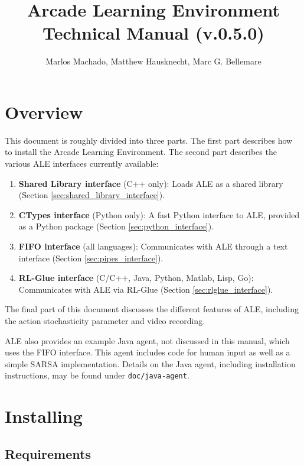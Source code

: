 \documentclass[12pt]{article}
\title{Arcade Learning Environment\\ Technical Manual (v.0.5.0)}
\author{Marlos Machado, Matthew Hausknecht, Marc G. Bellemare}
\begin{document}
\maketitle

\clearpage

\tableofcontents

\clearpage

\section{Overview}

This document is roughly divided into three parts. The first part describes how to install the Arcade Learning Environment. The second part describes the various ALE interfaces currently available: 
\begin{enumerate}
  \item \textbf{Shared Library interface} (C++ only): Loads ALE as a shared library (Section 
  \ref{sec:shared_library_interface}).
  \item \textbf{CTypes interface} (Python only): A fast Python interface to ALE, provided as a Python package (Section \ref{sec:python_interface}).
  \item \textbf{FIFO interface} (all languages): Communicates with ALE through a text interface (Section \ref{sec:pipes_interface}).
  \item \textbf{RL-Glue interface} (C/C++, Java, Python, Matlab, Lisp, Go): Communicates with ALE via RL-Glue (Section \ref{sec:rlglue_interface}).
\end{enumerate}
The final part of this document discusses the different features of ALE, including the action stochasticity parameter and video recording.

ALE also provides an example Java agent, not discussed in this manual, which uses the FIFO interface. This agent includes code for human input as well as a simple SARSA implementation. Details on the Java agent, including installation instructions, may be found under \verb+doc/java-agent+.

\section{Installing}\label{sec:install}

\subsection{Requirements}
\end{document}
